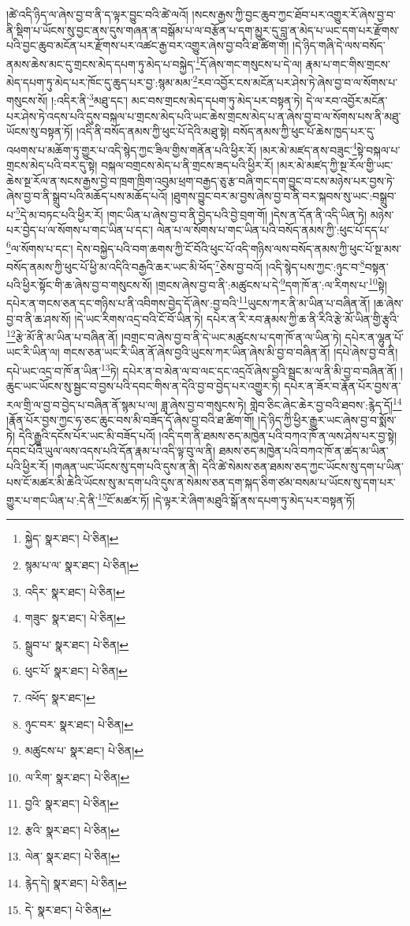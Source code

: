 །ཚེ་འདི་ཉིད་ལ་ཞེས་བྱ་བ་ནི་ད་ལྟར་བྱུང་བའི་ཚེ་ལའོ། །སངས་རྒྱས་ཀྱི་བྱང་ཆུབ་ཀྱང་ཐོབ་པར་འགྱུར་རོ་ཞེས་བྱ་བ་ནི་སྡིག་པ་ཡོངས་སུ་བྱང་ནས་དུས་གཞན་ན་བསྒོམ་པ་ལ་བརྩོན་པ་དག་མྱུར་དུ་བླ་ན་མེད་པ་ཡང་དག་པར་རྫོགས་པའི་བྱང་ཆུབ་མངོན་པར་རྫོགས་པར་འཚང་རྒྱ་བར་འགྱུར་ཞེས་བྱ་བའི་ཐ་ཚིག་གོ། །དེ་ཉིད་གཞི་དེ་ལས་བསོད་ནམས་ཆེས་མང་དུ་གྲངས་མེད་དཔག་ཏུ་མེད་པ་བསྐྱེད་\footnote{སྐྱེད་  སྣར་ཐང་།  པེ་ཅིན། }དོ་ཞེས་གང་གསུངས་པ་དེ་ལ། རྣམ་པ་གང་གིས་གྲངས་མེད་དཔག་ཏུ་མེད་པར་ཁོང་དུ་ཆུད་པར་བྱ་:སྙམ་མམ་\footnote{སྙམ་པ་ལ་  སྣར་ཐང་།  པེ་ཅིན། }རབ་འབྱོར་ངས་མངོན་པར་ཤེས་ཏེ་ཞེས་བྱ་བ་ལ་སོགས་པ་གསུངས་སོ། །:འདིར་ནི་\footnote{འདིར་  སྣར་ཐང་།  པེ་ཅིན། }མཐུ་དང་། མང་བས་གྲངས་མེད་དཔག་ཏུ་མེད་པར་བསྟན་ཏེ། དེ་ལ་རབ་འབྱོར་མངོན་པར་ཤེས་ཏེ་འདས་པའི་དུས་བསྐལ་པ་གྲངས་མེད་པའི་ཡང་ཆེས་གྲངས་མེད་པ་ན་ཞེས་བྱ་བ་ལ་སོགས་པས་ནི་མཐུ་ཡོངས་སུ་བསྟན་ཏོ། །འདི་ནི་བསོད་ནམས་ཀྱི་ཕུང་པོ་དེའི་མཐུ་སྟེ། བསོད་ནམས་ཀྱི་ཕུང་པོ་ཆེས་ཁྱད་པར་དུ་འཕགས་པ་མཆོག་ཏུ་གྱུར་པ་འདི་སྙེད་ཀྱང་ཟིལ་གྱིས་གནོན་པའི་ཕྱིར་རོ། །མར་མེ་མཛད་ནས་བཟུང་\footnote{གཟུང་  སྣར་ཐང་།  པེ་ཅིན། }སྟེ་བསྐལ་པ་གྲངས་མེད་པའི་བར་དུ་སྟེ། བསྐལ་བགྲངས་མེད་པ་ནི་གྲངས་ཟད་པའི་ཕྱིར་རོ། །མར་མེ་མཛད་ཀྱི་སྔ་རོལ་གྱི་ཡང་ཆེས་སྔ་རོལ་ན་སངས་རྒྱས་བྱེ་བ་ཁྲག་ཁྲིག་འབུམ་ཕྲག་བརྒྱད་ཅུ་རྩ་བཞི་གང་དག་བྱུང་བ་ངས་མཉེས་པར་བྱས་ཏེ་ཞེས་བྱ་བ་ནི་སྒྲུབ་པའི་མཆོད་པས་མཆོད་པའོ། །ཐུགས་བྱུང་བར་མ་བྱས་ཞེས་བྱ་བ་ནི་བར་སྐབས་སུ་ཡང་:བསྒྲུབ་པ་\footnote{སྒྲུབ་པ་  སྣར་ཐང་།  པེ་ཅིན། }དེ་མ་བཏང་པའི་ཕྱིར་རོ། །གང་ཡིན་པ་ཞེས་བྱ་བ་ནི་བྱེད་པའི་བྱེ་བྲག་གོ། །དེས་ན་དོན་ནི་འདི་ཡིན་ཏེ། མཉེས་པར་བྱེད་པ་ལ་སོགས་པ་གང་ཡིན་པ་དང་། ལེན་པ་ལ་སོགས་པ་གང་ཡིན་པའི་བསོད་ནམས་ཀྱི་:ཕུང་པོ་དད་པ་\footnote{ཕུང་པོ་  སྣར་ཐང་།  པེ་ཅིན། }ལ་སོགས་པ་དང་། དེས་བསྐྱེད་པའི་བག་ཆགས་ཀྱི་ངོ་བོའི་ཕུང་པོ་འདི་གཉིས་ལས་བསོད་ནམས་ཀྱི་ཕུང་པོ་སྔ་མས་བསོད་ནམས་ཀྱི་ཕུང་པོ་ཕྱི་མ་འདིའི་བརྒྱའི་ཆར་ཡང་མི་ཕོད་\footnote{འཕོད་  སྣར་ཐང་། }ཅེས་བྱ་བའོ། །འདི་སྙེད་པས་ཀྱང་:ཉུང་བ་\footnote{ཉུང་བར་  སྣར་ཐང་།  པེ་ཅིན། }བསྟན་པའི་ཕྱིར་སྟོང་གི་ཆ་ཞེས་བྱ་བ་གསུངས་སོ། །གྲངས་ཞེས་བྱ་བ་ནི་:མཚུངས་པ་དེ་\footnote{མཚུངས་པ་  སྣར་ཐང་།  པེ་ཅིན། }དག་ཁོ་ན་:ལ་རིགས་པ་\footnote{ལ་རིག་  སྣར་ཐང་།  པེ་ཅིན། }སྟེ། དཔེར་ན་གངས་ཅན་དང་གཉིས་པ་ནི་འབིགས་བྱེད་དོ་ཞེས་:བྱ་བའི་\footnote{བྱའི་  སྣར་ཐང་།  པེ་ཅིན། }ཡུངས་ཀར་ནི་མ་ཡིན་པ་བཞིན་ནོ། །ཆ་ཞེས་བྱ་བ་ནི་ཆ་ཤས་སོ། །དེ་ཡང་རིགས་འདྲ་བའི་ངོ་བོ་ཡིན་ཏེ། དཔེར་ན་རི་རབ་རྣམས་ཀྱི་ཆ་ནི་རིའི་རྩེ་མོ་ཡིན་གྱི་རྩྭའི་\footnote{རྩའི་  སྣར་ཐང་།  པེ་ཅིན། }རྩེ་མོ་ནི་མ་ཡིན་པ་བཞིན་ནོ། །བགྲང་བ་ཞེས་བྱ་བ་ནི་དེ་ཡང་མཚུངས་པ་དག་ཁོ་ན་ལ་ཡིན་ཏེ། དཔེར་ན་ལྷུན་པོ་ཡང་རི་ཡིན་ལ། གངས་ཅན་ཡང་རི་ཡིན་ནོ་ཞེས་བྱའི་ཡུངས་ཀར་ཡིན་ཞེས་མི་བྱ་བ་བཞིན་ནོ། །དཔེ་ཞེས་བྱ་བ་ནི། དཔེ་ཡང་འདྲ་བ་ཁོ་ན་ཡིན་\footnote{ལེན་  སྣར་ཐང་།  པེ་ཅིན། }ཏེ། དཔེར་ན་བ་མེན་ལ་བ་ལང་དང་འདྲའོ་ཞེས་བྱའི་སྦྲང་མ་ལ་ནི་མི་བྱ་བ་བཞིན་ནོ། །ཆུང་ཡང་ཡོངས་སུ་སྦྱང་བ་བྱས་པའི་དབང་གིས་ན་དེའི་བྱ་བ་བྱེད་པར་འགྱུར་ཏེ། དཔེར་ན་ཟོར་བ་རྣོན་པོར་བྱས་ན་རལ་གྲི་ལ་བྱ་བ་བྱེད་པ་བཞིན་ནོ་སྙམ་པ་ལ། ཟླ་ཞེས་བྱ་བ་གསུངས་ཏེ། གླེབ་ཅིང་ཞེང་ཆེར་བྱ་བའི་ཐབས་:རྙེད་དོ།\footnote{རྙེད་དེ།  སྣར་ཐང་།  པེ་ཅིན། } །རྣོན་པོར་བྱས་ཀྱང་ཧ་ཅང་ཆུང་བས་མི་བཟོད་དོ་ཞེས་བྱ་བའི་ཐ་ཚིག་གོ། །དེ་ཉིད་ཀྱི་ཕྱིར་རྒྱུར་ཡང་ཞེས་བྱ་བ་སྨོས་ཏེ། དེའི་རྒྱུའི་དངོས་པོར་ཡང་མི་བཟོད་པའོ། །འདི་དག་ནི་ཐམས་ཅད་མཁྱེན་པའི་བཀའ་ཁོ་ན་ལས་ཤེས་པར་བྱ་སྟེ། དབང་པོའི་ཡུལ་ལས་འདས་པའི་དོན་རྣམ་པ་འདི་ལྟ་བུ་ལ་ནི། ཐམས་ཅད་མཁྱེན་པའི་བཀའ་ཁོ་ན་ཚད་མ་ཡིན་པའི་ཕྱིར་རོ། །གཞན་ཡང་ཡོངས་སུ་དག་པའི་དུས་ན་ནི། དེའི་ཚེ་སེམས་ཅན་ཐམས་ཅད་ཀྱང་ཡོངས་སུ་དག་པ་ཡིན་པས་ངོ་མཚར་མི་ཆེའི་ཡོངས་སུ་མ་དག་པའི་དུས་ན་སེམས་ཅན་དག་སྐད་ཅིག་ཙམ་བསམ་པ་ཡོངས་སུ་དག་པར་གྱུར་པ་གང་ཡིན་པ་:དེ་ནི་\footnote{དེ་  སྣར་ཐང་།  པེ་ཅིན། }ངོ་མཚར་ཏོ། །དེ་ལྟར་རེ་ཞིག་མཐུའི་སྒོ་ནས་དཔག་ཏུ་མེད་པར་བསྟན་ཏོ། 